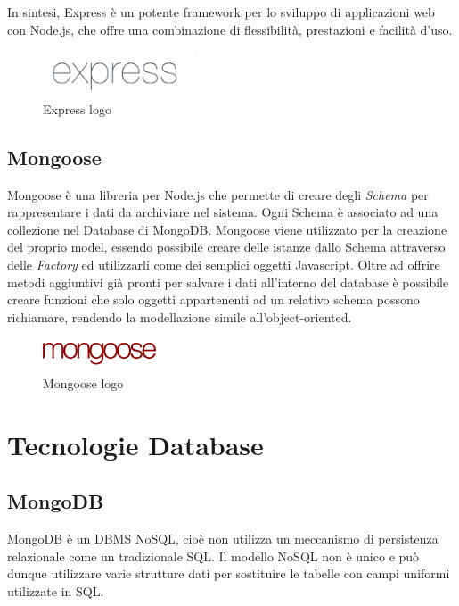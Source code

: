In sintesi, Express è un potente framework per lo sviluppo di applicazioni web con Node.js, che offre una combinazione di flessibilità, prestazioni e facilità d'uso.

\begin{figure}[H]
\centering
\includegraphics[width=0.4\textwidth]{img/logos/expressjs_logo.png}
\caption{Express logo}
\label{fig:express}
\end{figure}

\subsection{Mongoose}
Mongoose è una libreria per Node.js che permette di creare degli \emph{Schema} per rappresentare i dati da archiviare nel sistema.
Ogni Schema è associato ad una collezione nel Database di MongoDB.
Mongoose viene utilizzato per la creazione del proprio model, essendo possibile creare delle istanze dallo Schema attraverso delle \emph{Factory} ed utilizzarli come dei semplici oggetti Javascript.
Oltre ad offrire metodi aggiuntivi già pronti per salvare i dati all'interno del database è possibile creare funzioni che solo oggetti appartenenti ad un relativo schema possono richiamare, rendendo la modellazione simile all'object-oriented.\\

\begin{figure}[H]
\centering
\includegraphics[width=0.3\textwidth]{img/logos/mongoose_logo.png}
\caption{Mongoose logo}
\label{fig:mongoose}
\end{figure}

\section{Tecnologie Database}
\subsection{MongoDB}
MongoDB è un DBMS NoSQL, cioè non utilizza un meccanismo di persistenza relazionale come un tradizionale SQL.
Il modello NoSQL non è unico e può dunque utilizzare varie strutture dati per sostituire le tabelle con campi uniformi utilizzate in SQL.

